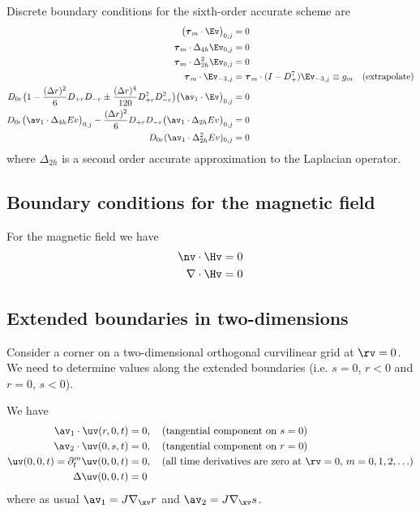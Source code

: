 \documentclass[10pt]{article}
\newcommand{\grad}{\nabla}
\begin{document}
Discrete boundary conditions for the sixth-order accurate scheme are
\begin{align*}
    \big(\tauv_m\cdot\Ev\big)_{0,j}  &=0  \\
 \tauv_m\cdot\Delta_{4h} \Ev_{0,j}  &=0  \\
 \tauv_m\cdot\Delta_{2h}^2 \Ev_{0,j}  &=0  \\
  \tauv_m\cdot\Ev_{-3,j} &= \tauv_m \cdot (I-D_+^7)\Ev_{-3,j} \equiv g_m   \quad\mbox{(extrapolate)}\\
  D_{0r}\big(1- {(\Delta r)^2\over 6} D_{+r}D_{-r}  
                  \pm {(\Delta r)^4\over 120} D_{+r}^2D_{-r}^2 \big)
                          \big(\av_1\cdot\Ev\big)_{0,j} &= 0 \\
  D_{0r}\big(\av_1\cdot \Delta_{4h}Ev \big)_{0,j}
    -{(\Delta r)^2\over 6} D_{+r}D_{-r}\big( \av_1\cdot \Delta_{2h}Ev\big)_{0,j} &= 0 \\
  D_{0r} (\av_1\cdot \Delta_{2h}^2 Ev )_{0,j} &= 0 
\end{align*}
where $\Delta_{2h}$ is a second order accurate approximation to the Laplacian operator.

\subsection{Boundary conditions for the magnetic field}
For the magnetic field we have
\begin{align*}
  \nv\cdot\Hv &= 0 \\
  \grad\cdot\Hv &=0 \\
\end{align*}

\clearpage
\subsection{Extended boundaries in two-dimensions}

Consider a corner on a two-dimensional orthogonal curvilinear grid at $\rv=0$.
We need to determine values along the extended boundaries (i.e. $s=0$, $r<0$ and $r=0$, $s<0$).


We have
\begin{align*}
  \av_1\cdot\uv(r,0,t) &= 0,  \quad\mbox{(tangential component on $s=0$)}\\
  \av_2\cdot\uv(0,s,t) &= 0,  \quad\mbox{(tangential component on $r=0$)}\\
  \uv(0,0,t)=\partial_t^m\uv(0,0,t) &= 0, \quad\mbox{(all time derivatives are zero at $\rv=0$, $m=0,1,2,\ldots$)} \\
  \Delta\uv(0,0,t) & =0
\end{align*}
where as usual $\av_1=J \grad_\xv r$ and $\av_2=J \grad_\xv s$.
\end{document}
